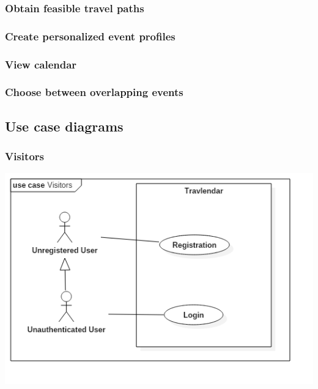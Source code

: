 	\subsubsection{Obtain feasible travel paths}
			
	
	\subsubsection{Create personalized event profiles}
		
		
	\subsubsection{View calendar}
		
	
	\subsubsection{Choose between overlapping events}
		
		
\subsection{Use case diagrams}
	\subsubsection{Visitors}
		\includegraphics[width=\textwidth,height=\textheight,keepaspectratio]{images/Visitors.png}
